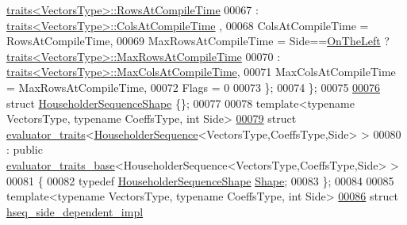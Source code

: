 \begin{DoxyCode}
      \hyperlink{struct_eigen_1_1internal_1_1traits}{traits<VectorsType>::RowsAtCompileTime}
00067                                         : \hyperlink{struct_eigen_1_1internal_1_1traits}{traits<VectorsType>::ColsAtCompileTime}
      ,
00068     ColsAtCompileTime = RowsAtCompileTime,
00069     MaxRowsAtCompileTime = Side==\hyperlink{group__enums_ggac22de43beeac7a78b384f99bed5cee0ba129609b3bdf23b071f5f86cf2f995ec4}{OnTheLeft} ? 
      \hyperlink{struct_eigen_1_1internal_1_1traits}{traits<VectorsType>::MaxRowsAtCompileTime}
00070                                            : 
      \hyperlink{struct_eigen_1_1internal_1_1traits}{traits<VectorsType>::MaxColsAtCompileTime},
00071     MaxColsAtCompileTime = MaxRowsAtCompileTime,
00072     Flags = 0
00073   \};
00074 \};
00075 
\hyperlink{struct_eigen_1_1internal_1_1_householder_sequence_shape}{00076} \textcolor{keyword}{struct }\hyperlink{struct_eigen_1_1internal_1_1_householder_sequence_shape}{HouseholderSequenceShape} \{\};
00077 
00078 \textcolor{keyword}{template}<\textcolor{keyword}{typename} VectorsType, \textcolor{keyword}{typename} CoeffsType, \textcolor{keywordtype}{int} S\textcolor{keywordtype}{id}e>
\hyperlink{struct_eigen_1_1internal_1_1evaluator__traits_3_01_householder_sequence_3_01_vectors_type_00_01_5d5adf52607be62fe2f73ff93bacbb36}{00079} \textcolor{keyword}{struct }\hyperlink{struct_eigen_1_1internal_1_1evaluator__traits}{evaluator\_traits}<\hyperlink{group___householder___module_class_eigen_1_1_householder_sequence}{HouseholderSequence}<VectorsType,CoeffsType,Side>
       >
00080   : \textcolor{keyword}{public} \hyperlink{struct_eigen_1_1internal_1_1evaluator__traits__base}{evaluator\_traits\_base}<HouseholderSequence<VectorsType,CoeffsType,Side> >
00081 \{
00082   \textcolor{keyword}{typedef} \hyperlink{struct_eigen_1_1internal_1_1_householder_sequence_shape}{HouseholderSequenceShape} \hyperlink{struct_eigen_1_1internal_1_1_householder_sequence_shape}{Shape};
00083 \};
00084 
00085 \textcolor{keyword}{template}<\textcolor{keyword}{typename} VectorsType, \textcolor{keyword}{typename} CoeffsType, \textcolor{keywordtype}{int} S\textcolor{keywordtype}{id}e>
\hyperlink{struct_eigen_1_1internal_1_1hseq__side__dependent__impl}{00086} \textcolor{keyword}{struct }\hyperlink{struct_eigen_1_1internal_1_1hseq__side__dependent__impl}{hseq\_side\_dependent\_impl}

\end{DoxyCode}
